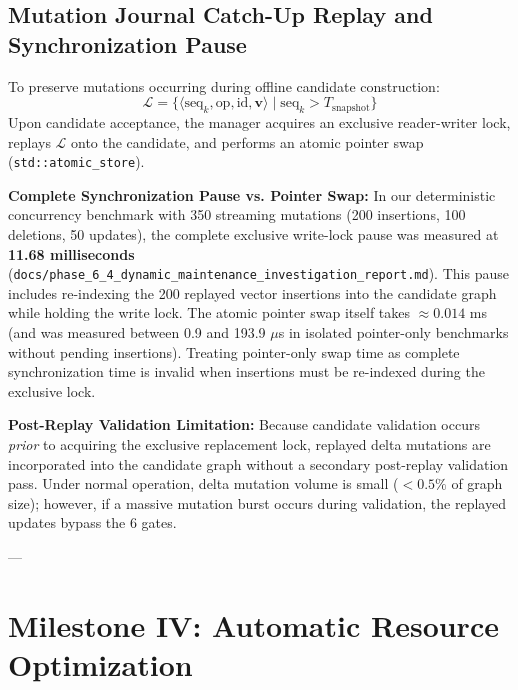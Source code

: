 \documentclass[10pt,journal,compsoc]{IEEEtran}
\begin{document}
\subsection{Mutation Journal Catch-Up Replay and Synchronization Pause}
To preserve mutations occurring during offline candidate construction:
\begin{equation}
\mathcal{L} = \{ \langle \text{seq}_k, \text{op}, \text{id}, \mathbf{v} \rangle \mid \text{seq}_k > T_{\text{snapshot}} \}
\end{equation}
Upon candidate acceptance, the manager acquires an exclusive reader-writer lock, replays $\mathcal{L}$ onto the candidate, and performs an atomic pointer swap (\texttt{std::atomic\_store}).

\textbf{Complete Synchronization Pause vs. Pointer Swap:}
In our deterministic concurrency benchmark with 350 streaming mutations (200 insertions, 100 deletions, 50 updates), the complete exclusive write-lock pause was measured at \textbf{11.68 milliseconds} (\texttt{docs/phase\_6\_4\_dynamic\_maintenance\_investigation\_report.md}). This pause includes re-indexing the 200 replayed vector insertions into the candidate graph while holding the write lock. The atomic pointer swap itself takes $\approx 0.014$ ms (and was measured between 0.9 and 193.9 $\mu$s in isolated pointer-only benchmarks without pending insertions). Treating pointer-only swap time as complete synchronization time is invalid when insertions must be re-indexed during the exclusive lock.

\textbf{Post-Replay Validation Limitation:}
Because candidate validation occurs \textit{prior} to acquiring the exclusive replacement lock, replayed delta mutations are incorporated into the candidate graph without a secondary post-replay validation pass. Under normal operation, delta mutation volume is small ($<0.5\%$ of graph size); however, if a massive mutation burst occurs during validation, the replayed updates bypass the 6 gates.

---

\section{Milestone IV: Automatic Resource Optimization}
\label{sec:autocalibrator}
\end{document}
